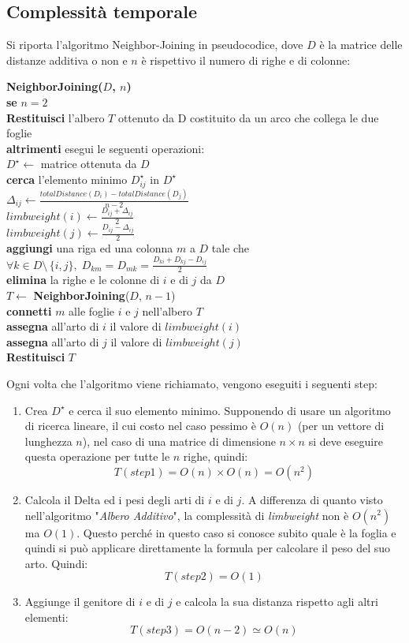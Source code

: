 \newpage
\subsection{Complessità temporale}
Si riporta l'algoritmo Neighbor-Joining in pseudocodice, dove $D$ è la matrice delle distanze additiva o non e $n$ è rispettivo il numero di righe e di colonne:
\begin{framed}\noindent
  \textbf{NeighborJoining($D$, $n$)}\\
  \textbf{se} $n=2$\\
  \indent \textbf{Restituisci} l'albero $T$ ottenuto da D costituito da un arco che collega le due foglie\\
  \textbf{altrimenti} esegui le seguenti operazioni: \\
  $D^\star \leftarrow $ matrice ottenuta da $D$\\
  \textbf{cerca} l'elemento minimo $D^\star_{ij}$ in $D^\star$\\
  $\Delta_{ij} \leftarrow \frac{totalDistance(D_i)-totalDistance(D_j)}{n-2}$\\
  $ limbweight(i) \leftarrow \frac{D_{ij}+\Delta_{ij}}{2}  $ \\
  $ limbweight(j) \leftarrow \frac{D_{ij}-\Delta_{ij}}{2}  $ \\
  \textbf{aggiungi} una riga ed una colonna $m$ a $D$  tale che $\forall k\in D\setminus \, \{i,j\}, \; D_{km}=D_{mk}=\frac{D_{ki}+D_{kj}-D_{ij}}{2}$\\
  \textbf{elimina} la righe e le colonne di $i$ e di $j$ da $D$\\
  $T \leftarrow$ \textbf{NeighborJoining}($D$, $n-1$) \\
  \textbf{connetti} $m$ alle foglie $i$ e $j$ nell'albero $T$ \\
  \textbf{assegna} all'arto di $i$ il valore di $limbweight(i)$\\
  \textbf{assegna} all'arto di $j$ il valore di $limbweight(j)$\\
  \textbf{Restituisci} $T$
\end{framed}
Ogni volta che l'algoritmo viene richiamato, vengono eseguiti i seguenti step:
\begin{enumerate}
	\item Crea $D^\star$ e cerca il suo elemento minimo. Supponendo di usare un algoritmo di ricerca lineare, il cui costo nel caso pessimo è $O(n)$ (per un vettore di lunghezza $n$), nel caso di una matrice di dimensione $n \times n$ si deve eseguire questa operazione per tutte le $n$ righe, quindi:
	\[T(step1)=O(n) \times O(n)=O(n^2)\]
	\item Calcola il Delta ed i pesi degli arti di $i$ e di $j$. A differenza di quanto visto nell'algoritmo "\textit{Albero Additivo}", la complessità di \textit{limbweight} non è $O(n^2)$ ma $O(1)$. Questo perché in questo caso si conosce subito quale è la foglia e quindi si può applicare direttamente la formula per calcolare il peso del suo arto. Quindi:
	\[T(step2)=O(1)\]
	\item Aggiunge il genitore di $i$ e di $j$ e calcola la sua distanza rispetto agli altri elementi:
	\[T(step3)=O(n-2)\simeq O(n)\] 
\end{enumerate}
